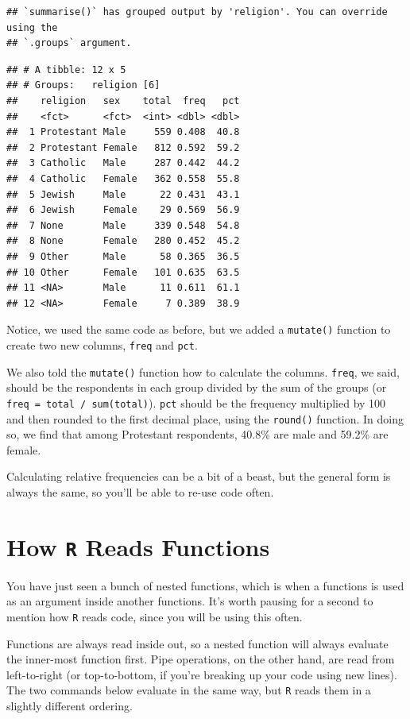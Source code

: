 \documentclass[
]{book}
\begin{document}
\begin{verbatim}
## `summarise()` has grouped output by 'religion'. You can override using the
## `.groups` argument.
\end{verbatim}

\begin{verbatim}
## # A tibble: 12 x 5
## # Groups:   religion [6]
##    religion   sex    total  freq   pct
##    <fct>      <fct>  <int> <dbl> <dbl>
##  1 Protestant Male     559 0.408  40.8
##  2 Protestant Female   812 0.592  59.2
##  3 Catholic   Male     287 0.442  44.2
##  4 Catholic   Female   362 0.558  55.8
##  5 Jewish     Male      22 0.431  43.1
##  6 Jewish     Female    29 0.569  56.9
##  7 None       Male     339 0.548  54.8
##  8 None       Female   280 0.452  45.2
##  9 Other      Male      58 0.365  36.5
## 10 Other      Female   101 0.635  63.5
## 11 <NA>       Male      11 0.611  61.1
## 12 <NA>       Female     7 0.389  38.9
\end{verbatim}

Notice, we used the same code as before, but we added a \texttt{mutate()} function to create two new columns, \texttt{freq} and \texttt{pct}.

We also told the \texttt{mutate()} function how to calculate the columns. \texttt{freq}, we said, should be the respondents in each group divided by the sum of the groups (or \texttt{freq\ =\ total\ /\ sum(total)}). \texttt{pct} should be the frequency multiplied by 100 and then rounded to the first decimal place, using the \texttt{round()} function. In doing so, we find that among Protestant respondents, 40.8\% are male and 59.2\% are female.

Calculating relative frequencies can be a bit of a beast, but the general form is always the same, so you'll be able to re-use code often.

\hypertarget{how-r-reads-functions}{%
\section{\texorpdfstring{How \texttt{R} Reads Functions}{How R Reads Functions}}\label{how-r-reads-functions}}

You have just seen a bunch of nested functions, which is when a functions is used as an argument inside another functions. It's worth pausing for a second to mention how \texttt{R} reads code, since you will be using this often.

Functions are always read inside out, so a nested function will always evaluate the inner-most function first. Pipe operations, on the other hand, are read from left-to-right (or top-to-bottom, if you're breaking up your code using new lines). The two commands below evaluate in the same way, but \texttt{R} reads them in a slightly different ordering.
\end{document}
